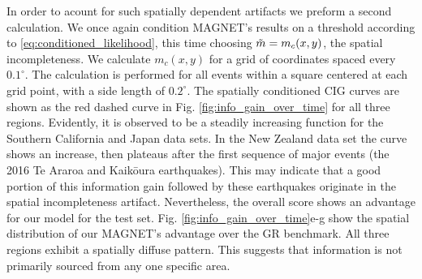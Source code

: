 \documentclass[pdflatex]{sn-jnl}
\begin{document}
In order to acount for such spatially dependent artifacts we preform a second calculation. We once again condition MAGNET's results on a threshold according to \ref{eq:conditioned_likelihood}, this time choosing $\Tilde{m}=m_c(x,y)$, the spatial incompleteness. We calculate $m_c(x,y)$ for a grid of coordinates spaced every $0.1^\circ$. The calculation is performed for all events within a square centered at each grid point, with a side length of $0.2^\circ$. The spatially conditioned CIG curves are shown as the red dashed curve in Fig. \ref{fig:info_gain_over_time} for all three regions. Evidently, it is observed to be a steadily increasing function for the Southern California and Japan data sets. In the New Zealand data set the curve shows an increase, then plateaus after the first sequence of major events (the 2016 Te Araroa and Kaikōura earthquakes). This may indicate that a good portion of this information gain followed by these earthquakes originate in the spatial incompleteness artifact. Nevertheless, the overall score shows an advantage for our model for the test set. Fig. \ref{fig:info_gain_over_time}e-g show the spatial distribution of our MAGNET's advantage over the GR benchmark. All three regions exhibit a spatially diffuse pattern. This suggests that information is not primarily sourced from any one specific area.
\end{document}
